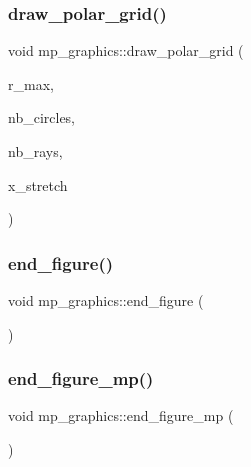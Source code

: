 \mbox{\label{classmp__graphics_a6fddb7e055dd8099413f41489342fcff}} 
\subsubsection{\texorpdfstring{draw\+\_\+polar\+\_\+grid()}{draw\_polar\_grid()}}
{\footnotesize\ttfamily void mp\+\_\+graphics\+::draw\+\_\+polar\+\_\+grid (\begin{DoxyParamCaption}\item[{double}]{r\+\_\+max,  }\item[{\mbox{\hyperlink{galois_8h_a09fddde158a3a20bd2dcadb609de11dc}{I\+NT}}}]{nb\+\_\+circles,  }\item[{\mbox{\hyperlink{galois_8h_a09fddde158a3a20bd2dcadb609de11dc}{I\+NT}}}]{nb\+\_\+rays,  }\item[{double}]{x\+\_\+stretch }\end{DoxyParamCaption})}

\mbox{\label{classmp__graphics_af7e758a9c83d809d033e1d18752d2925}} 
\subsubsection{\texorpdfstring{end\+\_\+figure()}{end\_figure()}}
{\footnotesize\ttfamily void mp\+\_\+graphics\+::end\+\_\+figure (\begin{DoxyParamCaption}{ }\end{DoxyParamCaption})}

\mbox{\label{classmp__graphics_a9689888a580c69708ba1ead311f4cd26}} 
\subsubsection{\texorpdfstring{end\+\_\+figure\+\_\+mp()}{end\_figure\_mp()}}
{\footnotesize\ttfamily void mp\+\_\+graphics\+::end\+\_\+figure\+\_\+mp (\begin{DoxyParamCaption}{ }\end{DoxyParamCaption})}

